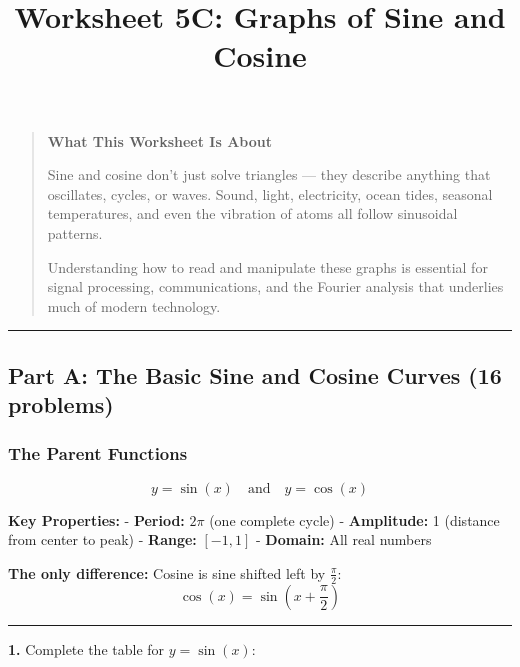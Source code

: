 \documentclass[
  11pt,
]{article}
\title{Worksheet 5C: Graphs of Sine and Cosine}
\author{}
\date{}
\begin{document}
\maketitle

\begin{quote}
\textbf{What This Worksheet Is About}

Sine and cosine don't just solve triangles --- they describe anything
that oscillates, cycles, or waves. Sound, light, electricity, ocean
tides, seasonal temperatures, and even the vibration of atoms all follow
sinusoidal patterns.

Understanding how to read and manipulate these graphs is essential for
signal processing, communications, and the Fourier analysis that
underlies much of modern technology.
\end{quote}

\begin{center}\rule{0.5\linewidth}{0.5pt}\end{center}

\hypertarget{part-a-the-basic-sine-and-cosine-curves-16-problems}{%
\subsection{Part A: The Basic Sine and Cosine Curves (16
problems)}\label{part-a-the-basic-sine-and-cosine-curves-16-problems}}

\hypertarget{the-parent-functions}{%
\subsubsection{The Parent Functions}\label{the-parent-functions}}

\[y = \sin(x) \quad \text{and} \quad y = \cos(x)\]

\textbf{Key Properties:} - \textbf{Period:} \(2\pi\) (one complete
cycle) - \textbf{Amplitude:} 1 (distance from center to peak) -
\textbf{Range:} \([-1, 1]\) - \textbf{Domain:} All real numbers

\textbf{The only difference:} Cosine is sine shifted left by
\(\frac{\pi}{2}\): \[\cos(x) = \sin\left(x + \frac{\pi}{2}\right)\]

\begin{center}\rule{0.5\linewidth}{0.5pt}\end{center}

\textbf{1.} Complete the table for \(y = \sin(x)\):
\end{document}
